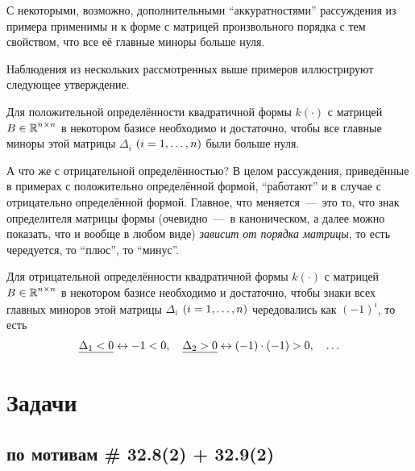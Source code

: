 \documentclass[a4paper,12pt]{article}
\begin{document}
  С некоторыми, возможно, дополнительными ``аккуратностями'' рассуждения из примера применимы и к форме с матрицей произвольного порядка с тем свойством, что все её главные миноры больше нуля.
  
  Наблюдения из нескольких рассмотренных выше примеров иллюстрируют следующее утверждение.
  
  \begin{theorem}
    Для положительной определённости квадратичной формы $k(\cdot)$ с матрицей $B \hm\in \RR^{n \times n}$ в некотором базисе необходимо и достаточно, чтобы все главные миноры этой матрицы $\Delta_i$ $(i \hm= 1, \ldots, n)$ были больше нуля.
  \end{theorem}
  
  А что же с отрицательной определённостью?
  В целом рассуждения, приведённые в примерах с положительно определённой формой, ``работают''  и в случае с отрицательно определённой формой.
  Главное, что меняется~---~это то, что знак определителя матрицы формы (очевидно~---~в каноническом, а далее можно показать, что и вообще в любом виде) \emph{зависит от порядка матрицы}, то есть чередуется, то ``плюс'', то ``минус''.
  
  \begin{theorem}
    Для отрицательной определённости квадратичной формы $k(\cdot)$ с матрицей $B \hm\in \RR^{n \times n}$ в некотором базисе необходимо и достаточно, чтобы знаки всех главных миноров этой матрицы $\Delta_i$ $(i \hm= 1, \ldots, n)$ чередовались как $(-1)^i$, то есть
    \[
      \underline{\Delta_1 \hm< 0} \leftrightarrow -1 \hm < 0,\quad \underline{\Delta_2 \hm> 0} \leftrightarrow (-1) \cdot (-1) \hm> 0,\quad \ldots
    \]
  \end{theorem}

  \newpage
  
  
  \section{Задачи}
  
  \subsection{по мотивам \# 32.8(2) + 32.9(2)}
  
\end{document}
